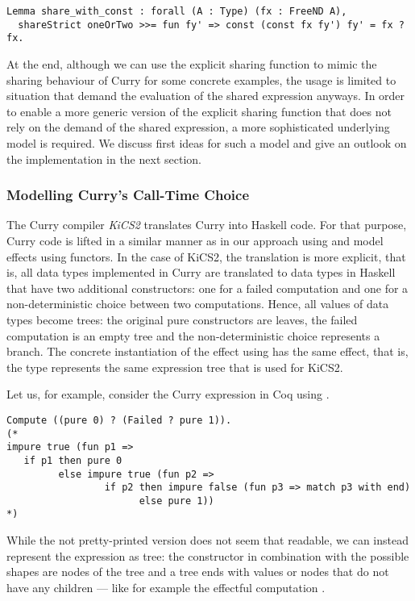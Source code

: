 \begin{verbatim}
Lemma share_with_const : forall (A : Type) (fx : FreeND A),
  shareStrict oneOrTwo >>= fun fy' => const (const fx fy') fy' = fx ? fx.
\end{verbatim}

At the end, although we can use the explicit sharing function
 to mimic the sharing behaviour of Curry for some
concrete examples, the usage is limited to situation that demand the
evaluation of the shared expression anyways.
In order to enable a more generic version of the explicit sharing
function that does not rely on the demand of the shared expression, a
more sophisticated underlying model is required.
We discuss first ideas for such a model and give an outlook on the
implementation in the next section.

\subsubsection{Modelling Curry's Call-Time Choice}

The Curry compiler \emph{KiCS2} translates Curry into Haskell code.
For that purpose, Curry code is lifted in a similar manner as in our
approach using  and model effects using functors.
In the case of KiCS2, the translation is more explicit, that is, all
data types implemented in Curry are translated to data types in
Haskell that have two additional constructors: one for a failed
computation and one for a non-deterministic choice between two
computations.
Hence, all values of data types become trees: the original pure
constructors are leaves, the failed computation is an empty tree and
the non-deterministic choice represents a branch.
The concrete instantiation of the effect using  has the same
effect, that is, the type  represents the same expression
tree that is used for KiCS2.

Let us, for example, consider the Curry expression 
in Coq using .

\begin{verbatim}
Compute ((pure 0) ? (Failed ? pure 1)).
(*
impure true (fun p1 =>
   if p1 then pure 0
         else impure true (fun p2 =>
                 if p2 then impure false (fun p3 => match p3 with end)
                       else pure 1))
*)
\end{verbatim}

While the not pretty-printed version does not seem that readable, we
can instead represent the expression as tree: the constructor
 in combination with the possible shapes are nodes of the
tree and a tree ends with  values or nodes that do not have
any children --- like for example the effectful computation .

